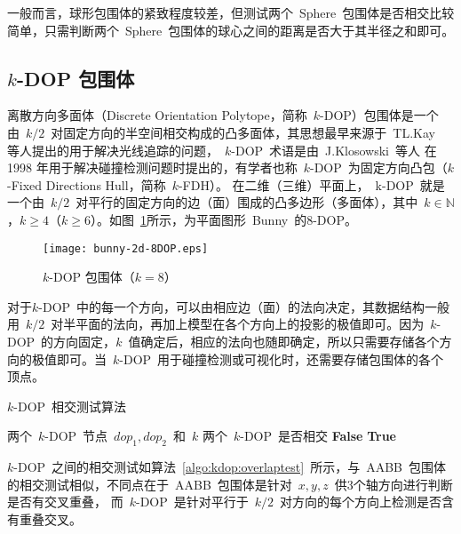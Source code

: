 一般而言，球形包围体的紧致程度较差，但测试两个~Sphere~包围体是否相交比较简单，只需判断两个~Sphere~包围体的球心之间的距离是否大于其半径之和即可。

\subsection{$k$-DOP 包围体}

离散方向多面体（Discrete Orientation Polytope，简称~$k$-DOP）包围体是一个由~$k/2$~对固定方向的半空间相交构成的凸多面体，其思想最早来源于~TL.Kay~\cite{Kay1986Ray}
等人提出的用于解决光线追踪的问题，~$k$-DOP~术语是由~J.Klosowski~等人\cite{klosowski1998efficient}
在1998 年用于解决碰撞检测问题时提出的，有学者也称~$k$-DOP~为固定方向凸包（$k$-Fixed
Directions Hull，简称~$k$-FDH）\cite{weiyingmei2001}。
在二维（三维）平面上，~k-DOP~就是一个由~$k/2$~对平行的固定方向的边（面）围成的凸多边形（多面体），其中~$k\in\mathbb{N}$，$k\geq4$（$k\geq6$）。如图~\ref{fig:8dop-bunny}所示，为平面图形~Bunny~的$8$-DOP。
\begin{figure}[htbp] %
  \centering
  \texttt{[image: bunny-2d-8DOP.eps]}
  \caption{$k$-DOP 包围体（$k=8$）}
  \label{fig:8dop-bunny}
\end{figure}

对于$k$-DOP~中的每一个方向，可以由相应边（面）的法向决定，其数据结构一般用~$k/2$~对半平面的法向，再加上模型在各个方向上的投影的极值即可。因为~$k$-DOP~的方向固定，$k$~值确定后，相应的法向也随即确定，所以只需要存储各个方向的极值即可。当~$k$-DOP~用于碰撞检测或可视化时，还需要存储包围体的各个顶点。

\begin{algorithm}
\caption{$k$-DOP~相交测试算法}
\small
\label{algo:kdop:overlaptest}
\begin{algorithmic}[1]
\Require
两个~$k$-DOP~节点~$dop_1, dop_2$~和~$k$ 
\Ensure
两个~$k$-DOP~是否相交
          \State \Return \textbf{False} 
      \EndIf
  \EndFor
  \State \Return \textbf{True} 
\EndFunction
\end{algorithmic}
\end{algorithm}

$k$-DOP~之间的相交测试如算法~\ref{algo:kdop:overlaptest}~所示\cite{ericson2005real}，与~AABB~包围体的相交测试相似，不同点在于~AABB~包围体是针对~$x,y,z$~供3个轴方向进行判断是否有交叉重叠，
而~$k$-DOP~是针对平行于~$k/2$~对方向的每个方向上检测是否含有重叠交叉。


